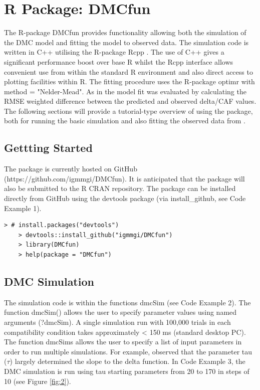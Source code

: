 \section{R Package: DMCfun} 
The R-package DMCfun provides functionality allowing both the simulation of the
DMC model and fitting the model to observed data. The simulation code is
written in C++ utilising the R-package Rcpp \parencite{eddelbuettel2011rcpp}.
The use of C++ gives a significant performance boost over base R whilst the
Rcpp interface allows convenient use from within the standard R environment
and also direct access to plotting facilities within R. The fitting procedure
uses the R-package optimr \textcite{optimr} with method = "Nelder-Mead". As in
\textcite{ulrich2015automatic} the model fit was evaluated by calculating the
RMSE weighted difference between the predicted and observed delta/CAF values.
The following sections will provide a tutorial-type overview of using the
package, both for running the basic simulation and also fitting the observed
data from \textcite{ulrich2015automatic}.

\label{dmc_fun}
\subsection{Gettting Started}
\label{getting_started}
The package is currently hosted on GitHub (https://github.com/igmmgi/DMCfun).
It is anticipated that the package will also be submitted to the R CRAN
repository. The package can be installed directly from GitHub using the
devtools package (via install\_github, see Code Example 1).

\begin{minipage}{\linewidth}
    \begin{lstlisting}[style = R, title={R Code Example 1: instalation}, captionpos=t]
    > # install.packages("devtools")
    > devtools::install_github("igmmgi/DMCfun")
    > library(DMCfun)
    > help(package = "DMCfun")  
    \end{lstlisting}
\end{minipage}

\subsection{DMC Simulation}
\label{dmc_simulation}
The simulation code is within the functions dmcSim (see Code Example 2).  The
function dmcSim() allows the user to specify parameter values using named
arguments (?dmcSim). A single simulation run with 100,000 trials in each
compatibility condition takes approximately < 150 ms (standard desktop PC).
The function dmcSims allows the user to specify a list of input parameters in
order to run multiple simulations. For example, \textcite{ulrich2015automatic}
observed that the parameter tau ($\tau$) largely determined the slope to the
delta function. In Code Example 3, the DMC simulation is run using tau starting
parameters from 20 to 170 in steps of 10 (see Figure \ref{fig:2}).

